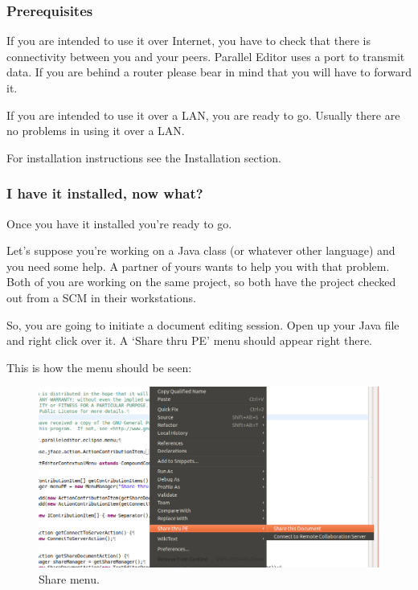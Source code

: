 \subsubsection{Prerequisites}

If you are intended to use it over Internet, you have to check that there is connectivity between
you and your peers. Parallel Editor uses a port to transmit data. If you are behind a router 
please bear in mind that you will have to forward it.


If you are intended to use it over a LAN, you are ready to go. Usually there are no problems in
using it over a LAN.

For installation instructions see the Installation section. %

\subsubsection{I have it installed, now what?}

Once you have it installed you're ready to go.

Let's suppose you're working on a Java class (or whatever other language) and you need some help. A 
partner of yours wants to help you with that problem. Both of you are working on the same project, so
both have the project checked out from a SCM in their workstations.

So, you are going to initiate a document editing session. Open up your Java file and right click over it. 
A `Share thru PE' menu should appear right there.

This is how the menu should be seen: 
\begin{figure}[!ht]
	\begin{center}
		\includegraphics[width=14cm]{contextual_menu.png}
		\caption{\label{share} Share menu.}
	\end{center}
\end{figure}


